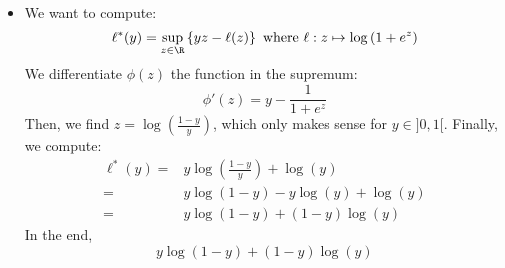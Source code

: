 \documentclass[math, info]{cours}
\begin{document}
\begin{itemize}
\begin{thm}
		\end{thm}
		\begin{proof}
			Let $x \in \R^{n}$. For all $y$, the directional derivative:
			\begin{equation*}
				\partial_{y}f(x) = \lim_{\d t \to 0} \frac{f\left( x + \d t y \right) - f(x)}{\d t}
			\end{equation*}
			is a sublinear as a function of $y$.
			From the Hahn-Banach theorem, there exists $\tilde{\partial f} \in \left(\R^{n}\right)^{*} = \R^{n}$ such that:
			\begin{equation*}
				\scalar{\tilde{\partial f},\cdot }\leq \partial_{y}f(x) \leq f\left( x + y \right) - f(x), \forall y \in \R^{n}
			\end{equation*}
			Then:
			\begin{equation*}
				f(x) + f^{*}\left( \tilde{\partial f} \right) = \scalar{\tilde{\partial f}, x}
			\end{equation*}
			which completes our proof that $f^{**} = f$.
		\end{proof}

	\item We want to compute:
		\begin{equation*}
			\ell^{*}(y) = \sup_{z\in \R}\left\{ yz - \ell(z) \right\} \text{ where } \ell: z\mapsto \log\left( 1 + e^{z} \right)
		\end{equation*}
		We differentiate $\phi(z)$ the function in the supremum:
		\begin{equation*}
			\phi'(z) = y - \frac{1}{1 + e^{z}}
		\end{equation*}
		Then, we find $z = \log\left( \frac{1 - y}{y} \right)$, which only makes sense for $y \in ]0, 1[$.
		Finally, we compute:
		\begin{equation*}
			\begin{aligned}
				\ell^{*}(y) =& y\log\left( \frac{1-y}{y} \right) + \log(y)\\
				=& y\log(1 - y) - y\log(y) + \log(y)\\
				=& y\log\left( 1 - y \right) + \left( 1 - y \right)\log(y)
			\end{aligned}
		\end{equation*}
		In the end,
		\begin{equation*}
			\boxed{y\log\left( 1 - y \right) + \left( 1 - y \right)\log\left( y \right)}
		\end{equation*}
\end{itemize}
\end{document}
